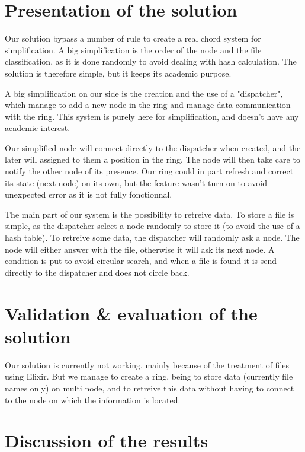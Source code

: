 \documentclass{article}
\begin{document}
\pagebreak

\section{Presentation of the solution}

Our solution bypass a number of rule to create a real chord system for simplification. A big simplification is the order of the node and the file classification, as it is done randomly to avoid dealing with hash calculation. The solution is therefore simple, but it keeps its academic purpose.

A big simplification on our side is the creation and the use of a "dispatcher", which manage to add a new node in the ring and manage data communication with the ring. This system is purely here for simplification, and doesn't have any academic interest.

Our simplified node will connect directly to the dispatcher when created, and the later will assigned to them a position in the ring. The node will then take care to notify the other node of its presence. Our ring could in part refresh and correct its state (next node) on its own, but the feature wasn't turn on to avoid unexpected error as it is not fully fonctionnal.

The main part of our system is the possibility to retreive data. To store a file is simple, as the dispatcher select a node randomly to store it (to avoid the use of a hash table). To retreive some data, the dispatcher will randomly ask a node. The node will either answer with the file, otherwise it will ask its next node. A condition is put to avoid circular search, and when a file is found it is send directly to the dispatcher and does not circle back.


\section{Validation \& evaluation of the solution}

Our solution is currently not working, mainly because of the treatment of files using Elixir. But we manage to create a ring, being to store data (currently file names only) on multi node, and to retreive this data without having to connect to the node on which the information is located. 


\section{Discussion of the results}
\end{document}
